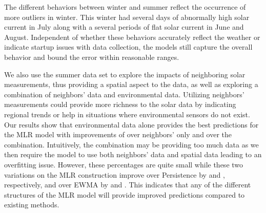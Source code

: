 \documentclass[prodmode,acmtosn]{acmsmall}
\begin{document}
The different behaviors between winter and summer reflect the occurrence of more outliers in winter.
This winter had several days of abnormally high solar current in July along with a several periods of flat solar current in June and August.
Independent of whether these behaviors accurately reflect the weather or indicate startup issues with data collection, the models still capture the overall behavior and bound the error within reasonable ranges.

We also use the summer data set to explore the impacts of neighboring solar measurements, thus providing a spatial aspect to the data, as well as exploring a combination of neighbors' data and environmental data.
Utilizing neighbors' measurements could provide more richness to the solar data by indicating regional trends or help in situations where environmental sensors do not exist.
Our results show that environmental data alone provides the best predictions for the MLR model with improvements of  over neighbors' only and  over the combination.
Intuitively, the combination may be providing too much data as we then require the model to use both neighbors' data and spatial  data leading to an overfitting issue.
However, these percentages are quite small while these two variations on the MLR construction improve over Persistence by  and , respectively, and over EWMA by  and .
This indicates that any of the different structures of the MLR model will provide  improved predictions compared to existing methods.

\begin{table*}[h]
\centering
{}
\end{table*}
\end{document}
